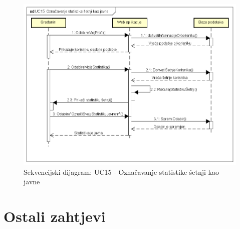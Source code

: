 			\begin{figure}[H]
			\includegraphics[scale=0.67]{dijagrami/UC15.png} %
			\caption{Sekvencijski dijagram: UC15 - Označavanje statistike šetnji kao javne}
			\label{fig:UC15} %
			\end{figure}
	
		\newpage
		
	\section{Ostali zahtjevi}
	

	 
